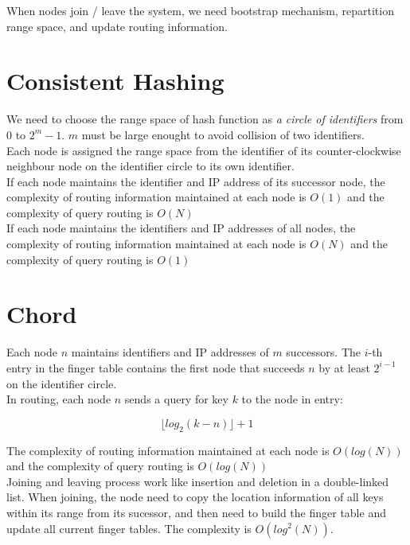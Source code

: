 \begin{multicols*}{2}
\noindent When nodes join / leave the system, we need bootstrap mechanism, repartition range space, and update routing information.

\section{Consistent Hashing}

\noindent We need to choose the range space of hash function as \emph{a circle of identifiers} from $0$ to $2^m -1$. $m$ must be large enought to avoid collision of two identifiers. \\

\noindent Each node is assigned the range space from the identifier of its counter-clockwise neighbour node on the identifier circle to its own identifier.\\

\noindent If each node maintains the identifier and IP address of its successor node, the complexity of routing information maintained at each node is $O(1)$ and the complexity of query routing is $O(N)$\\

\noindent If each node maintains the identifiers and IP addresses of all nodes, the complexity of routing information maintained at each node is $O(N)$ and the complexity of query routing is $O(1)$

\section{Chord}

\noindent Each node $n$ maintains identifiers and IP addresses of $m$ successors. The $i$-th entry in the finger table contains the first node that succeeds $n$ by at least $2^{i-1}$ on the identifier circle. \\

\noindent In routing, each node $n$ sends a query for key $k$ to the node in entry:

$$\lfloor log_2(k-n) \rfloor + 1$$

\noindent The complexity of routing information maintained at each node is $O(log(N))$ and the complexity of query routing is $O(log(N))$\\

\noindent Joining and leaving process work like insertion and deletion in a double-linked list. When joining, the node need to copy the location information of all keys within its range from its sucessor, and then need to build the finger table and update all current finger tables. The complexity is $O(log^2(N))$.


\end{multicols*}
